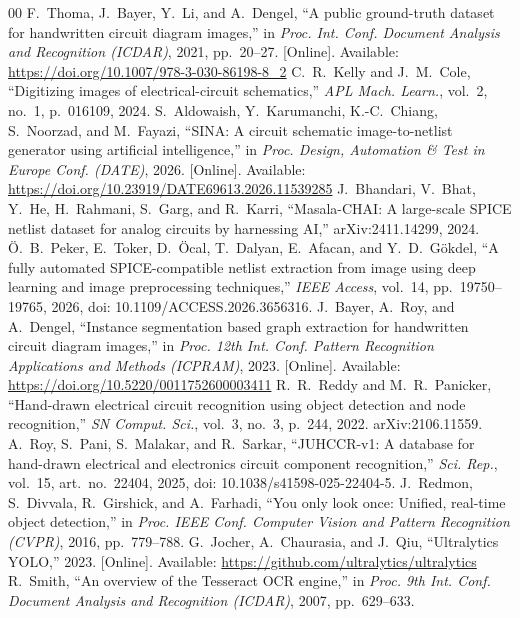 \documentclass[journal]{IEEEtran}
\begin{document}
\begin{thebibliography}{00}
 F.~Thoma, J.~Bayer, Y.~Li, and A.~Dengel, ``A public ground-truth dataset for handwritten circuit diagram images,'' in \textit{Proc. Int. Conf. Document Analysis and Recognition (ICDAR)}, 2021, pp.~20--27. [Online]. Available: \url{https://doi.org/10.1007/978-3-030-86198-8_2}
 C.~R.~Kelly and J.~M.~Cole, ``Digitizing images of electrical-circuit schematics,'' \textit{APL Mach. Learn.}, vol.~2, no.~1, p.~016109, 2024.
 S.~Aldowaish, Y.~Karumanchi, K.-C.~Chiang, S.~Noorzad, and M.~Fayazi, ``SINA: A circuit schematic image-to-netlist generator using artificial intelligence,'' in \textit{Proc. Design, Automation \& Test in Europe Conf. (DATE)}, 2026. [Online]. Available: \url{https://doi.org/10.23919/DATE69613.2026.11539285}
 J.~Bhandari, V.~Bhat, Y.~He, H.~Rahmani, S.~Garg, and R.~Karri, ``Masala-CHAI: A large-scale SPICE netlist dataset for analog circuits by harnessing AI,'' arXiv:2411.14299, 2024.
 \"{O}.~B.~Peker, E.~Toker, D.~\"{O}cal, T.~Dalyan, E.~Afacan, and Y.~D.~G\"{o}kdel, ``A fully automated SPICE-compatible netlist extraction from image using deep learning and image preprocessing techniques,'' \textit{IEEE Access}, vol.~14, pp.~19750--19765, 2026, doi: 10.1109/ACCESS.2026.3656316.
 J.~Bayer, A.~Roy, and A.~Dengel, ``Instance segmentation based graph extraction for handwritten circuit diagram images,'' in \textit{Proc. 12th Int. Conf. Pattern Recognition Applications and Methods (ICPRAM)}, 2023. [Online]. Available: \url{https://doi.org/10.5220/0011752600003411}
 R.~R.~Reddy and M.~R.~Panicker, ``Hand-drawn electrical circuit recognition using object detection and node recognition,'' \textit{SN Comput. Sci.}, vol.~3, no.~3, p.~244, 2022. arXiv:2106.11559.
 A.~Roy, S.~Pani, S.~Malakar, and R.~Sarkar, ``JUHCCR-v1: A database for hand-drawn electrical and electronics circuit component recognition,'' \textit{Sci. Rep.}, vol.~15, art.~no.~22404, 2025, doi: 10.1038/s41598-025-22404-5.
 J.~Redmon, S.~Divvala, R.~Girshick, and A.~Farhadi, ``You only look once: Unified, real-time object detection,'' in \textit{Proc. IEEE Conf. Computer Vision and Pattern Recognition (CVPR)}, 2016, pp.~779--788.
 G.~Jocher, A.~Chaurasia, and J.~Qiu, ``Ultralytics YOLO,'' 2023. [Online]. Available: \url{https://github.com/ultralytics/ultralytics}
 R.~Smith, ``An overview of the Tesseract OCR engine,'' in \textit{Proc. 9th Int. Conf. Document Analysis and Recognition (ICDAR)}, 2007, pp.~629--633.

\end{thebibliography}
\end{document}
